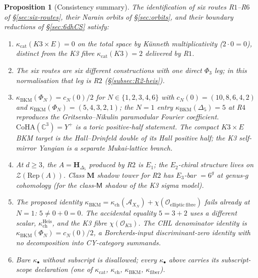 \documentclass[11pt]{article}
\newtheorem{proposition}[theorem]{Proposition}
\begin{document}
\begin{proposition}[Consistency summary]
\label{prop:consistency}
The identification of six routes R$1$--R$6$ of \S\ref{sec:six-routes},
their Narain orbits of \S\ref{sec:orbits}, and their boundary
reductions of \S\ref{sec:6dhCS} satisfy:
\begin{enumerate}
\item $\kappa_{\mathrm{cat}}(K3 \times E) = 0$ on the total space by
K\"unneth multiplicativity ($2 \cdot 0 = 0$), distinct from the
K3 fibre $\kappa_{\mathrm{cat}}(K3) = 2$ delivered by R$1$.
\item The six routes are six different constructions with one direct
$\Phi_3$ leg; in this normalisation that leg is R$2$
(\S\ref{subsec:R2-heis}).
\item $\kappa_{\mathrm{BKM}}(\Phi_N) = c_N(0)/2$ for
$N \in \{1, 2, 3, 4, 6\}$ with
$c_N(0)=(10,8,6,4,2)$ and
$\kappa_{\mathrm{BKM}}(\Phi_N)=(5,4,3,2,1)$; the $N = 1$ entry
$\kappa_{\mathrm{BKM}}(\Delta_5) = 5$ at R$4$
reproduces the Gritsenko--Nikulin paramodular Fourier coefficient.
$\mathrm{CoHA}(\mathbb C^3) = Y^+$ is a toric positive-half
statement. The compact $K3\times E$ BKM target is the
Hall--Drinfeld double of its Hall positive half; the K3 self-mirror
Yangian is a separate Mukai-lattice branch.
\item At $d \geq 3$, the $A = \mathbf H_{\Delta_5}$ produced by R$2$
is $E_1$; the $E_2$-chiral structure lives on
$\mathcal Z(\mathrm{Rep}(A))$.
Class $\mathbf M$ shadow tower for R$2$ has
$E_3$-bar $= 6^g$ at genus-$g$ cohomology
(for the class-$\mathsf M$ shadow of the K3 sigma model).
\item The proposed identity
$\kappa_{\mathrm{BKM}}=\kappa_{\mathrm{ch}}(\mathcal A_{X_N})
+\chi(\mathcal O_{\mathrm{elliptic\ fibre}})$
fails already at $N = 1$: $5 \neq 0 + 0 = 0$. The accidental equality
$5=3+2$ uses a different scalar,
$\kappa_{\mathrm{ch}}^{\mathrm{Heis}}$, and the K3 fibre
$\chi(\mathcal O_{K3})$. The CHL denominator identity is
$\kappa_{\mathrm{BKM}}(\Phi_N) = c_N(0)/2$, a Borcherds-input
discriminant-zero identity with no decomposition into CY-category
summands.
\item Bare $\kappa_\bullet$ without subscript is disallowed; every
$\kappa_\bullet$ above carries its subscript-scope declaration
(one of $\kappa_{\mathrm{cat}}$, $\kappa_{\mathrm{ch}}$,
$\kappa_{\mathrm{BKM}}$, $\kappa_{\mathrm{fiber}}$).
\end{enumerate}
\end{proposition}
\end{document}
